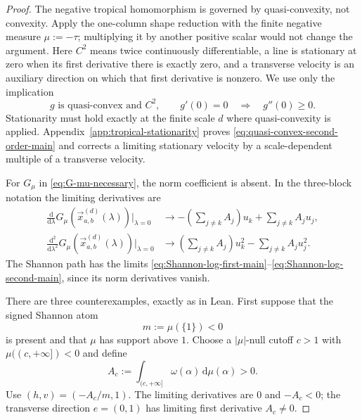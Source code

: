 \documentclass[aps,pra,11pt,onecolumn,nofootinbib,tightenlines]{revtex4-2}
\theoremstyle{definition}
\begin{document}
\begin{proof}
The negative tropical homomorphism is governed by quasi-convexity, not
convexity.  Apply the one-column shape reduction with the finite negative
measure $\mu:=-\tau$; multiplying it by another positive scalar would not
change the argument.  Here $C^2$ means twice continuously differentiable, a
line is stationary at zero when its first derivative there is exactly zero,
and a transverse velocity is an auxiliary direction on which that first
derivative is nonzero.  We use only the implication
\begin{equation}
 g\text{ is quasi-convex and }C^2,
 \qquad
 g'(0)=0
 \quad\Longrightarrow\quad
 g''(0)\geq0.
 \label{eq:quasi-convex-second-order-main}
\end{equation}
Stationarity must hold exactly at the finite scale $d$ where quasi-convexity is
applied.  Appendix~\ref{app:tropical-stationarity} proves
\eqref{eq:quasi-convex-second-order-main} and corrects a limiting stationary
velocity by a scale-dependent multiple of a transverse velocity.

For $G_\mu$ in \eqref{eq:G-mu-necessary}, the norm coefficient is absent.  In
the three-block notation the limiting derivatives are
\begin{align}
 \frac{\mathrm d}{\mathrm d\lambda}
 G_\mu(\vec x_{a,b}^{(d)}(\lambda))\bigg|_{\lambda=0}
 &\longrightarrow
 -\left(\sum_{j\neq k}A_j\right)u_k
 +\sum_{j\neq k}A_ju_j,
 \label{eq:tropical-three-first-main}\\
 \frac{\mathrm d^2}{\mathrm d\lambda^2}
 G_\mu(\vec x_{a,b}^{(d)}(\lambda))\bigg|_{\lambda=0}
 &\longrightarrow
 \left(\sum_{j\neq k}A_j\right)u_k^2
 -\sum_{j\neq k}A_ju_j^2.
 \label{eq:tropical-three-second-main}
\end{align}
The Shannon path has the limits
\eqref{eq:Shannon-log-first-main}--\eqref{eq:Shannon-log-second-main}, since
its norm derivatives vanish.

There are three counterexamples, exactly as in Lean.  First suppose that the
signed Shannon atom
\begin{equation}
 m:=\mu(\{1\})<0
 \label{eq:tropical-Shannon-atom-local}
\end{equation}
is present and that $\mu$ has support above $1$.  Choose a $|\mu|$-null cutoff
$c>1$ with $\mu((c,+\infty])<0$ and define
\begin{equation}
 A_c:=\int_{(c,+\infty]}\omega(\alpha)\,\mathrm d\mu(\alpha)>0.
 \label{eq:tropical-Shannon-tail-local}
\end{equation}
Use
$(h,v)=(-A_c/m,1)$.  The limiting derivatives are $0$ and $-A_c<0$; the
transverse direction $e=(0,1)$ has limiting first derivative $A_c\neq0$.


\end{proof}
\end{document}
